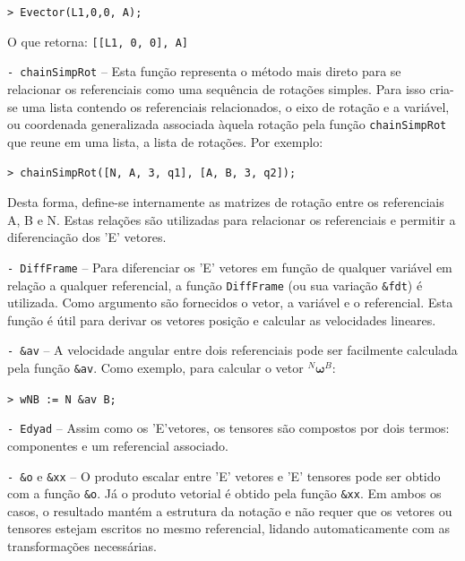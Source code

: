 \medskip \texttt{> Evector(L1,0,0, A);	} \medskip

\noindent O que retorna: \texttt{[[L1, 0, 0], A]} \medskip


\medskip \noindent
\texttt{- chainSimpRot} -- Esta função representa o método mais direto para se
relacionar os referenciais como uma sequência de rotações simples. Para
isso cria-se uma lista contendo os referenciais relacionados, o eixo de rotação
e a variável, ou coordenada generalizada associada àquela rotação pela função
\texttt{chainSimpRot} que reune em uma lista, a lista de rotações. Por exemplo:

\medskip \texttt{> chainSimpRot([N, A, 3, q1], [A, B, 3, q2]);	}
\medskip

Desta forma, define-se internamente as matrizes de rotação entre os referenciais
A, B e N. Estas relações são utilizadas para relacionar os referenciais e
permitir a diferenciação dos 'E' vetores.

\medskip \noindent \texttt{- DiffFrame} -- Para diferenciar os 'E' vetores em
função de qualquer variável em relação a qualquer referencial, a função
\texttt{DiffFrame} (ou sua variação \texttt{\&fdt}) é utilizada. Como argumento
são fornecidos o vetor, a variável e o referencial.
Esta função é útil para derivar os vetores posição e calcular as velocidades
lineares.

\medskip \noindent
\texttt{- \&av} -- A velocidade angular entre dois referenciais pode ser
facilmente calculada pela função \texttt{\&av}. Como exemplo, para calcular o
vetor $^N\boldsymbol{\omega}^B$:

\medskip \texttt{> wNB := N \&av B; } \medskip

\medskip \noindent
\texttt{- Edyad} -- Assim como os 'E'vetores, os tensores são compostos por dois
termos: componentes e um referencial associado.

\medskip \noindent
\texttt{- \&o} e \texttt{\&xx} -- O produto escalar entre 'E' vetores e 'E'
tensores pode ser obtido com a função \texttt{\&o}.
Já o produto vetorial é obtido pela função \texttt{\&xx}. Em ambos os casos, o
resultado mantém a estrutura da notação e não requer que os vetores ou tensores
estejam escritos no mesmo referencial, lidando automaticamente com as
transformações necessárias.

